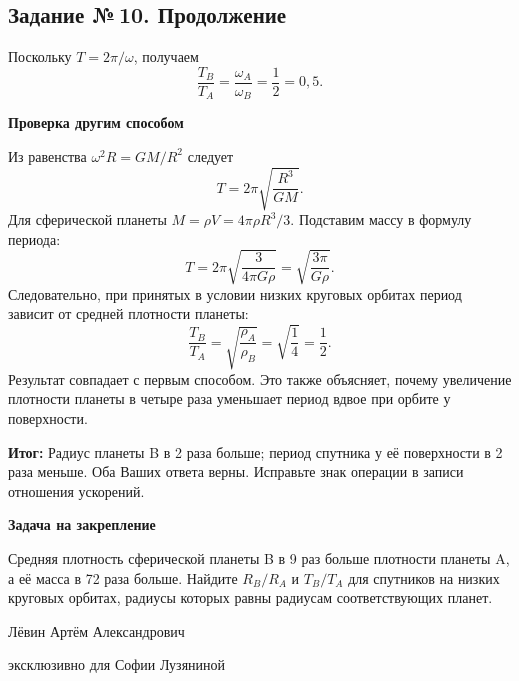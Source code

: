 \documentclass[a4paper,12pt]{article}
\newcommand{\topic}[1]{\par\medskip\textbf{\textcolor{darkaccent}{#1}}\par}
\newcommand{\result}[1]{\par\medskip\textbf{\textcolor{accent}{Итог:}} #1\par}
\begin{document}
\subsection*{Задание №\,10. Продолжение}
Поскольку $T=2\pi/\omega$, получаем
\[ \frac{T_B}{T_A}=\frac{\omega_A}{\omega_B}=\frac12=0{,}5. \]
\topic{Проверка другим способом}
Из равенства $\omega^2R=GM/R^2$ следует
\[ T=2\pi\sqrt{\frac{R^3}{GM}}. \]
Для сферической планеты $M=\rho V=4\pi\rho R^3/3$. Подставим массу в формулу периода:
\[ T=2\pi\sqrt{\frac{3}{4\pi G\rho}}=\sqrt{\frac{3\pi}{G\rho}}. \]
Следовательно, при принятых в условии низких круговых орбитах период зависит от средней плотности планеты:
\[ \frac{T_B}{T_A}=\sqrt{\frac{\rho_A}{\rho_B}}=\sqrt{\frac14}=\frac12. \]
Результат совпадает с первым способом. Это также объясняет, почему увеличение плотности планеты в четыре раза уменьшает период вдвое при орбите у поверхности.
\result{Радиус планеты B в 2 раза больше; период спутника у её поверхности в 2 раза меньше. Оба Ваших ответа верны. Исправьте знак операции в записи отношения ускорений.}
\topic{Задача на закрепление}
Средняя плотность сферической планеты B в 9 раз больше плотности планеты A, а её масса в 72 раза больше. Найдите $R_B/R_A$ и $T_B/T_A$ для спутников на низких круговых орбитах, радиусы которых равны радиусам соответствующих планет.
\vfill
\begin{center}\small Лёвин Артём Александрович\par эксклюзивно для Софии Лузяниной\end{center}
\end{document}
